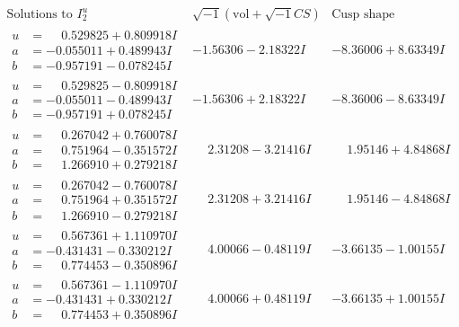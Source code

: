\documentclass[1p]{elsarticle_modified}
\theoremstyle{definition}
\newcommand{\I}{\sqrt{-1}}
\begin{document}
$$\begin{array}{c|c|c}  
\text{Solutions to }I^u_{2}& \I (\text{vol} + \sqrt{-1}CS) & \text{Cusp shape}\\
 \hline 
\begin{aligned}
u &= \phantom{-}0.529825 + 0.809918 I \\
a &= -0.055011 + 0.489943 I \\
b &= -0.957191 - 0.078245 I\end{aligned}
 & -1.56306 - 2.18322 I & -8.36006 + 8.63349 I \\ \hline\begin{aligned}
u &= \phantom{-}0.529825 - 0.809918 I \\
a &= -0.055011 - 0.489943 I \\
b &= -0.957191 + 0.078245 I\end{aligned}
 & -1.56306 + 2.18322 I & -8.36006 - 8.63349 I \\ \hline\begin{aligned}
u &= \phantom{-}0.267042 + 0.760078 I \\
a &= \phantom{-}0.751964 - 0.351572 I \\
b &= \phantom{-}1.266910 + 0.279218 I\end{aligned}
 & \phantom{-}2.31208 - 3.21416 I & \phantom{-}1.95146 + 4.84868 I \\ \hline\begin{aligned}
u &= \phantom{-}0.267042 - 0.760078 I \\
a &= \phantom{-}0.751964 + 0.351572 I \\
b &= \phantom{-}1.266910 - 0.279218 I\end{aligned}
 & \phantom{-}2.31208 + 3.21416 I & \phantom{-}1.95146 - 4.84868 I \\ \hline\begin{aligned}
u &= \phantom{-}0.567361 + 1.110970 I \\
a &= -0.431431 - 0.330212 I \\
b &= \phantom{-}0.774453 - 0.350896 I\end{aligned}
 & \phantom{-}4.00066 - 0.48119 I & -3.66135 - 1.00155 I \\ \hline\begin{aligned}
u &= \phantom{-}0.567361 - 1.110970 I \\
a &= -0.431431 + 0.330212 I \\
b &= \phantom{-}0.774453 + 0.350896 I\end{aligned}
 & \phantom{-}4.00066 + 0.48119 I & -3.66135 + 1.00155 I \\ \hline\begin{aligned}

\end{aligned}
\end{array}$$
\end{document}
